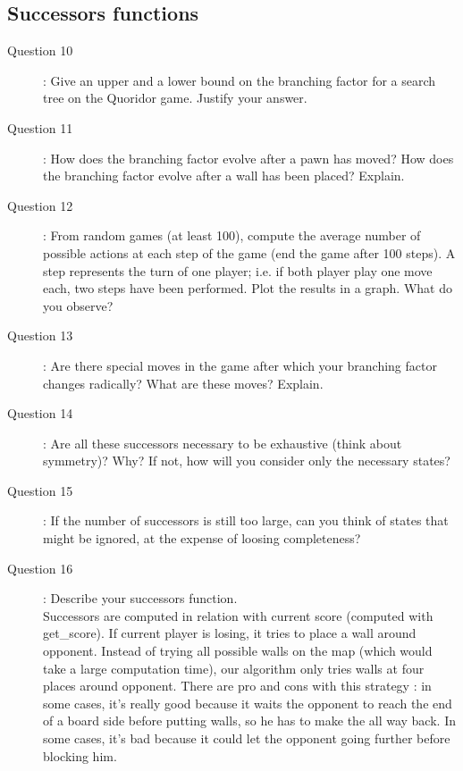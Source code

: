 \subsection{Successors functions}
\begin{description}
\item[Question 10]: Give an upper and a lower bound on the branching factor for a search tree on the Quoridor game. Justify your answer.\\

\item[Question 11]: How does the branching factor evolve after a pawn has moved? How does the branching factor evolve after a wall has been placed? Explain.\\

\item[Question 12]: From random games (at least 100), compute the average number of possible actions at each step of the game (end the game after 100 steps). A step represents the turn of one player; i.e. if both player play one move each, two steps have been performed. Plot the results in a graph. What do you observe?\\

\item[Question 13]: Are there special moves in the game after which your branching factor changes radically? What are these moves? Explain.\\

\item[Question 14]: Are all these successors necessary to be exhaustive (think about symmetry)? Why? If not, how will you consider only the necessary states?\\

\item[Question 15]: If the number of successors is still too large, can you think of states that might be ignored, at the expense of loosing completeness?\\

\item[Question 16]: Describe your successors function.\\
Successors are computed in relation with current score (computed with get\_score). If current player is losing, it tries to place a wall around opponent. Instead of trying all possible walls on the map (which would take a large computation time), our algorithm only tries walls at four places around opponent. There are pro and cons with this strategy : in some cases, it's really good because it waits the opponent to reach the end of a board side before putting walls, so he has to make the all way back. In some cases, it's bad because it could let the opponent going further before blocking him.
\end{description}

